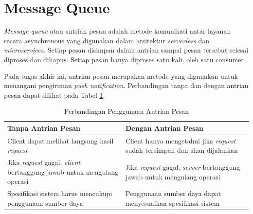 \section{Message Queue}
\par \textit{Message queue} atau antrian pesan adalah metode komunikasi antar layanan secara asynchronous yang digunakan dalam arsitektur \textit{serverless} dan \textit{microservices}. Setiap pesan disimpan dalam antrian sampai pesan tersebut selesai diproses dan dihapus. Setiap pesan hanya diproses satu kali, oleh satu consumer \cite{message-queue-online}.
\par Pada tugas akhir ini, antrian pesan merupakan metode yang digunakan untuk menangani pengiriman \textit{push notification}. Perbandingan tanpa dan dengan antrian pesan dapat dilihat pada Tabel \ref{t:perbandingan-antrian-pesan}.
\begin{longtable}{|p{4.5cm}|p{4.5cm}|}
	\caption{Perbandingan Penggunaan Antrian Pesan} \label{t:perbandingan-antrian-pesan} \\ \hline
	\rowcolor{lightgray} Tanpa Antrian Pesan & Dengan Antrian Pesan \\ \hline
	Client dapat melihat langsung hasil \textit{request} & Client hanya mengetahui jika \textit{request} sudah tersimpan dan akan dijalankan \\ \hline
	Jika \textit{request} gagal, \textit{client} bertanggung jawab untuk mengulang operasi & Jika \textit{request} gagal, \textit{server} bertanggung jawab untuk mengulang operasi \\ \hline
	Spesifikasi sistem harus mencukupi penggunaan sumber daya & Penggunaan sumber daya dapat menyesuaikan spesifikasi sistem \\ \hline
\end{longtable}


